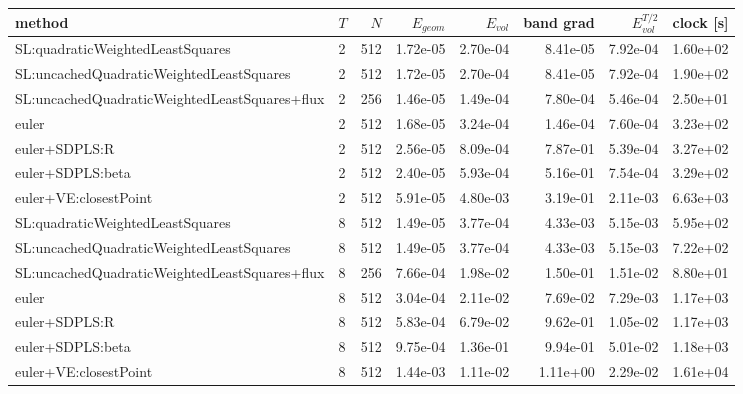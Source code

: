 \begin{tabular}{l l r r r r r r}
\hline
method & $T$ & $N$ & $E_{geom}$ & $E_{vol}$ & band grad & $E_{vol}^{T/2}$ & clock [s] \\
\hline
SL:quadraticWeightedLeastSquares & 2 & 512 & 1.72e-05 & 2.70e-04 & 8.41e-05 & 7.92e-04 & 1.60e+02 \\
SL:uncachedQuadraticWeightedLeastSquares & 2 & 512 & 1.72e-05 & 2.70e-04 & 8.41e-05 & 7.92e-04 & 1.90e+02 \\
SL:uncachedQuadraticWeightedLeastSquares+flux & 2 & 256 & 1.46e-05 & 1.49e-04 & 7.80e-04 & 5.46e-04 & 2.50e+01 \\
euler & 2 & 512 & 1.68e-05 & 3.24e-04 & 1.46e-04 & 7.60e-04 & 3.23e+02 \\
euler+SDPLS:R & 2 & 512 & 2.56e-05 & 8.09e-04 & 7.87e-01 & 5.39e-04 & 3.27e+02 \\
euler+SDPLS:beta & 2 & 512 & 2.40e-05 & 5.93e-04 & 5.16e-01 & 7.54e-04 & 3.29e+02 \\
euler+VE:closestPoint & 2 & 512 & 5.91e-05 & 4.80e-03 & 3.19e-01 & 2.11e-03 & 6.63e+03 \\
\hline
SL:quadraticWeightedLeastSquares & 8 & 512 & 1.49e-05 & 3.77e-04 & 4.33e-03 & 5.15e-03 & 5.95e+02 \\
SL:uncachedQuadraticWeightedLeastSquares & 8 & 512 & 1.49e-05 & 3.77e-04 & 4.33e-03 & 5.15e-03 & 7.22e+02 \\
SL:uncachedQuadraticWeightedLeastSquares+flux & 8 & 256 & 7.66e-04 & 1.98e-02 & 1.50e-01 & 1.51e-02 & 8.80e+01 \\
euler & 8 & 512 & 3.04e-04 & 2.11e-02 & 7.69e-02 & 7.29e-03 & 1.17e+03 \\
euler+SDPLS:R & 8 & 512 & 5.83e-04 & 6.79e-02 & 9.62e-01 & 1.05e-02 & 1.17e+03 \\
euler+SDPLS:beta & 8 & 512 & 9.75e-04 & 1.36e-01 & 9.94e-01 & 5.01e-02 & 1.18e+03 \\
euler+VE:closestPoint & 8 & 512 & 1.44e-03 & 1.11e-02 & 1.11e+00 & 2.29e-02 & 1.61e+04 \\
\hline
\end{tabular}

